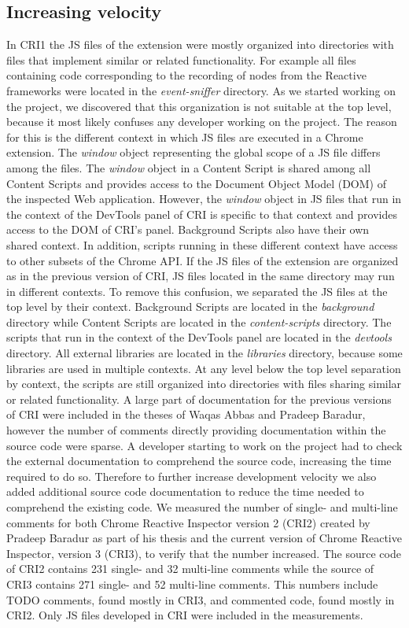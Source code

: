 \subsection{Increasing velocity}
In CRI1 the JS files of the extension were mostly organized into directories with files that implement similar or related functionality. For example all files containing code corresponding to the recording of nodes from the Reactive frameworks were located in the \emph{event-sniffer} directory. As we started working on the project, we discovered that this organization is not suitable at the top level, because it most likely confuses any developer working on the project. The reason for this is the different context in which JS files are executed in a Chrome extension. The \emph{window} object representing the global scope of a JS file differs among the files. The \emph{window} object in a Content Script is shared among all Content Scripts and provides access to the Document Object Model (DOM) of the inspected Web application. However, the \emph{window} object in JS files that run in the context of the DevTools panel of CRI is specific to that context and provides access to the DOM of CRI's panel. Background Scripts also have their own shared context. In addition, scripts running in these different context have access to other subsets of the Chrome API. If the JS files of the extension are organized as in the previous version of CRI, JS files located in the same directory may run in different contexts. To remove this confusion, we separated the JS files at the top level by their context. Background Scripts are located in the \emph{background} directory while Content Scripts are located in the \emph{content-scripts} directory. The scripts that run in the context of the DevTools panel are located in the \emph{devtools} directory. All external libraries are located in the \emph{libraries} directory, because some libraries are used in multiple contexts. At any level below the top level separation by context, the scripts are still organized into directories with files sharing similar or related functionality.
A large part of documentation for the previous versions of CRI were included in the theses of Waqas Abbas and Pradeep Baradur, however the number of comments directly providing documentation within the source code were sparse. A developer starting to work on the project had to check the external documentation to comprehend the source code, increasing the time required to do so. Therefore to further increase development velocity we also added additional source code documentation to reduce the time needed to comprehend the existing code. We measured the number of single- and multi-line comments for both Chrome Reactive Inspector version 2 (CRI2) created by Pradeep Baradur as part of his thesis and the current version of Chrome Reactive Inspector, version 3 (CRI3), to verify that the number increased. The source code of CRI2 contains 231 single- and 32 multi-line comments while the source of CRI3 contains 271 single- and 52 multi-line comments. This numbers include TODO comments, found mostly in CRI3, and commented code, found mostly in CRI2. Only JS files developed in CRI were included in the measurements. 

